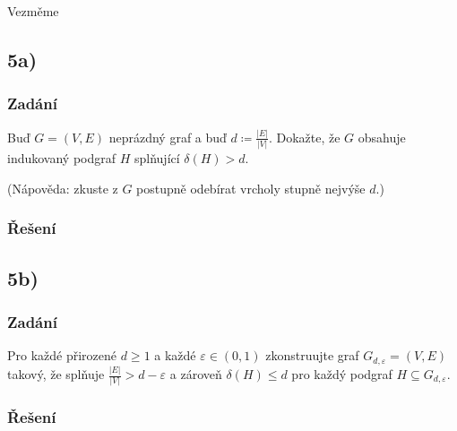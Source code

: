 \documentclass[../main.tex]{subfiles}
\begin{document}
Vezměme 




\subsection{5a)}
\subsubsection*{Zadání}
Buď $G=(V,E)$ neprázdný graf a buď $d \coloneq \frac{|E|}{|V|}$. Dokažte, že $G$ obsahuje indukovaný podgraf $H$ splňující $\delta(H) > d$.

(Nápověda: zkuste z $G$ postupně odebírat vrcholy stupně nejvýše $d$.)

\subsubsection*{Řešení}


\subsection{5b)}
\subsubsection*{Zadání}
Pro každé přirozené $d\geq 1$ a každé $\varepsilon\in(0,1)$ zkonstruujte graf $G_{d,\varepsilon}= (V,E)$
takový, že splňuje $\frac{|E|}{|V|} > d - \varepsilon$ a zároveň $\delta(H)\leq d$ pro každý podgraf $H \subseteq G_{d,\varepsilon}$.


\subsubsection*{Řešení}
\end{document}
